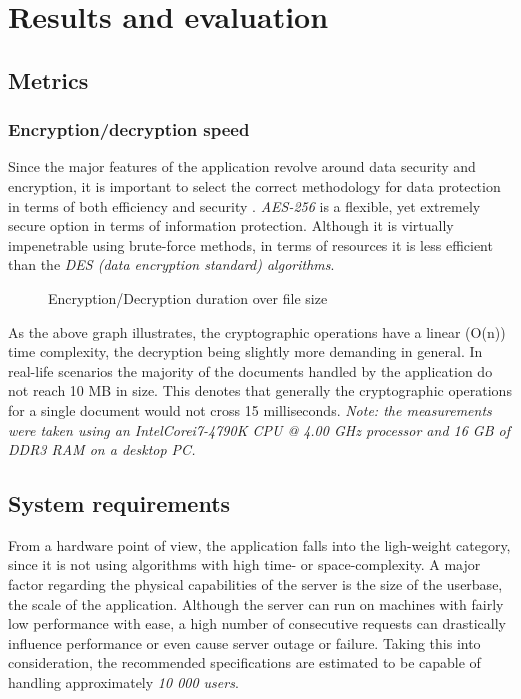 \chapter{Results and evaluation}\label{ch:elemzes}

\section{Metrics}

\subsection{Encryption/decryption speed}

Since the major features of the application revolve around data security and encryption,
it is important to select the correct methodology for data protection in terms of both efficiency and security \cite{singh2013study}.
\emph{AES-256} is a flexible, yet extremely secure option in terms of information protection.
Although it is virtually impenetrable using brute-force methods, in terms of resources it is less efficient than the \emph{DES (data encryption standard) algorithms}.

\begin{figure}[H]
	\centering
	
	\caption{Encryption/Decryption duration over file size}
\end{figure}

As the above graph illustrates, the cryptographic operations have a linear (O(n)) time complexity, the decryption being slightly more demanding in general.
In real-life scenarios the majority of the documents handled by the application do not reach 10 MB in size.
This denotes that generally the cryptographic operations for a single document would not cross 15 milliseconds.
\emph{Note: the measurements were taken using an Intel\textregistered  Core\texttrademark  i7-4790K CPU @ 4.00 GHz processor and 16 GB of DDR3 RAM on a desktop PC.}

\section{System requirements}

From a hardware point of view, the application falls into the ligh-weight category, since it is not using algorithms with high time- or space-complexity.
A major factor regarding the physical capabilities of the server is the size of the userbase, the scale of the application.
Although the server can run on machines with fairly low performance with ease, a high number of consecutive requests can drastically influence 
performance or even cause server outage or failure.
Taking this into consideration, the recommended specifications are estimated to be capable of handling approximately \emph{10 000 users}.

